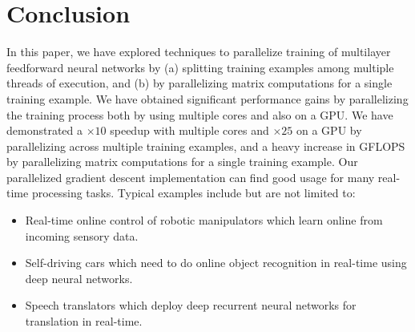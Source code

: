 \section{Conclusion}
\label{Concl}

In this paper, we have explored techniques to parallelize training of multilayer feedforward neural networks by (a) splitting training examples among multiple threads of execution, and (b) by parallelizing matrix computations for a single training example.
We have obtained significant performance gains by parallelizing the training process both by using multiple cores and also on a GPU. We have demonstrated a $\times 10$ speedup with multiple cores and $\times 25$ on a GPU by parallelizing across multiple training examples, and a heavy increase in GFLOPS by parallelizing matrix computations for a single training example.
Our parallelized gradient descent implementation can find good usage for many real-time processing tasks. Typical examples include but are not limited to:
\begin{itemize}
\vspace{-6pt}
\item Real-time online control of robotic manipulators which learn online from incoming sensory data.
\vspace{-4pt}
\item Self-driving cars which need to do online object recognition in real-time using deep neural networks.
\vspace{-4pt}
\item Speech translators which deploy deep recurrent neural networks for translation in real-time.
\end{itemize}